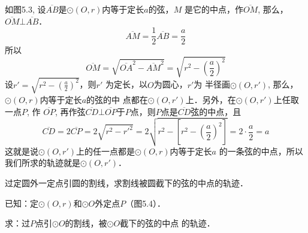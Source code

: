 \begin{solution}
    如图5.3, 设$\overline{AB}$是$\odot (O,r)$内等于定长$a$的弦，$M$
是它的中点，作$\overline{OM}$, 那么，$\overline{OM}\bot \overline{AB}$．
\[\overline{AM}=\frac{1}{2}\overline{AB}=\frac{a}{2}\]
所以
\[\overline{OM}=\sqrt{\overline{OA}^2-\overline{AM}^2}=\sqrt{r^2-\left(\frac{a}{2}\right)^2}\]
设$r'=\sqrt{r^2-\left(\frac{a}{2}\right)^2}$，则$r'$
为定长，以$O$为圆心，$r'$为
半径画$\odot (O,r')$, 那么，$\odot (O,r)$内等于定长$a$的弦的中
点都在$\odot (O,r')$上．另外，在$\odot (O,r')$上任取一点$P$, 作
$\overline{OP}$, 再作弦$\overline{CD}\bot\overline{OP}$于$P$点，则$P$点是$\overline{CD}$弦的中点，且
\[\overline{CD}=2\overline{CP}=2\sqrt{r^2-{r'}^2}=2\sqrt{r^2-\left[r^2-\left(\frac{a}{2}\right)^2\right]}=2\cdot\frac{a}{2}=a\]
这就是说$\odot (O,r')$上的任一点都是$\odot (O,r)$内等于定长$a$
的一条弦的中点，所以我们所求的轨迹就是$\odot (O,r')$．
\end{solution}

\begin{example}
    过定圆外一定点引圆的割线，求割线被圆截下的弦的中点的轨迹．

    已知：定$\odot (O,r)$和$\odot O$外定点$P$（图5.4）．
    
    求：过$P$点引$\odot O$的割线，被$\odot O$截下的弦的中点
    的轨迹．
\end{example}


\begin{figure}[htp]
    \centering
{}
    \caption{}
\end{figure}

